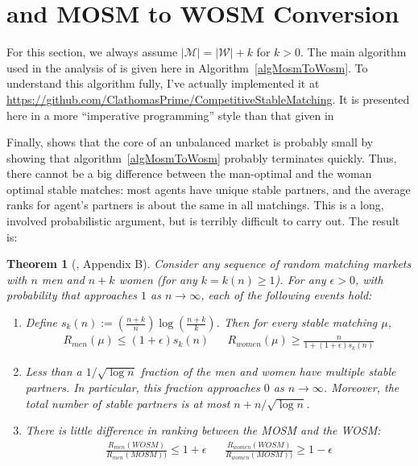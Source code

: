 \documentclass[12pt]{article}
\newcommand{\M}{\mathcal{M}}
\newcommand{\W}{\mathcal{W}}
\newtheorem{theorem}[definition]{Theorem}
\begin{document}
\section{\cite{AshlagiUnbalancedCompetition17} and MOSM to WOSM Conversion}

  For this section, we always assume $|\M| = |\W| + k$ for $k > 0$.
  The main algorithm used in the analysis of
  \cite{AshlagiUnbalancedCompetition17} is given here in
  Algorithm~\ref{algMosmToWosm}.
  To understand this algorithm fully, I've actually implemented it
  at \url{https://github.com/ClathomasPrime/CompetitiveStableMatching}.
  It is presented here in a more ``imperative programming'' style than that
  given in \cite{AshlagiUnbalancedCompetition17}

  Finally, \cite{AshlagiUnbalancedCompetition17} shows that the core of an
  unbalanced market is probably small by showing that
  algorithm~\ref{algMosmToWosm} probably terminates quickly.
  Thus, there cannot be a big difference between the man-optimal and the woman
  optimal stable matches: most agents have unique stable partners, and the
  average ranks for agent's partners is about the same in all matchings.
  This is a long, involved probabilistic argument, but is terribly difficult to
  carry out. The result is:

  \begin{theorem}[\cite{AshlagiUnbalancedCompetition17}, Appendix B]
    Consider any sequence of random matching markets with $n$ men and $n+k$ women
    (for any $k = k(n) \ge 1$).
    For any $\epsilon>0$, with probability that approaches $1$ as $n\to\infty$,
    each of the following events hold:
    \begin{enumerate}
      \item Define $ s_k(n) := \left(\frac{n+k} n\right) 
        \log\left(\frac{n+k} k\right)$.
        Then for every stable matching $\mu$,
        \begin{align*}
          R_{men}(\mu) \le (1+\epsilon)s_k(n) &&
          R_{women}(\mu) \ge \frac n {1 + (1+\epsilon)s_k(n)}
        \end{align*}
      \item Less than a $1/\sqrt{\log n}$ fraction of the men and women have
        multiple stable partners. In particular, this fraction approaches $0$ as
        $n\to\infty$.
        Moreover, the total number of stable partners
        is at most $n + n/\sqrt{\log n}$.
      \item There is little difference in ranking between the MOSM and the WOSM:
        \begin{align*}
          \frac{R_{men}(WOSM)}{R_{men}(MOSM))} \le 1+\epsilon &&
          \frac{R_{women}(WOSM)}{R_{women}(MOSM))} \ge 1-\epsilon
        \end{align*}
    \end{enumerate}
  \end{theorem}
\end{document}
